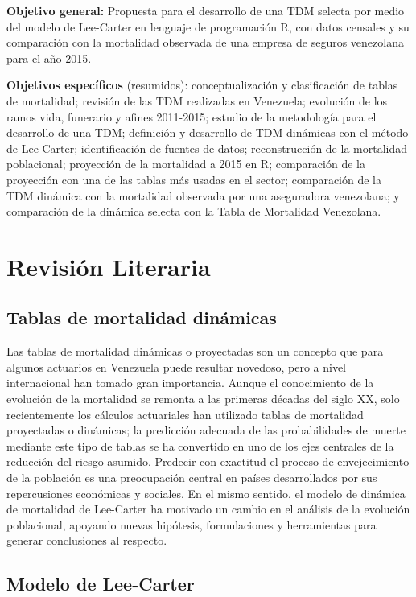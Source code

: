\documentclass[
  11pt,
  a4paper,
]{article}
\begin{document}
\textbf{Objetivo general:} Propuesta para el desarrollo de una TDM
selecta por medio del modelo de Lee-Carter en lenguaje de programación
R, con datos censales y su comparación con la mortalidad observada de
una empresa de seguros venezolana para el año 2015.

\textbf{Objetivos específicos} (resumidos): conceptualización y
clasificación de tablas de mortalidad; revisión de las TDM realizadas en
Venezuela; evolución de los ramos vida, funerario y afines 2011-2015;
estudio de la metodología para el desarrollo de una TDM; definición y
desarrollo de TDM dinámicas con el método de Lee-Carter; identificación
de fuentes de datos; reconstrucción de la mortalidad poblacional;
proyección de la mortalidad a 2015 en R; comparación de la proyección
con una de las tablas más usadas en el sector; comparación de la TDM
dinámica con la mortalidad observada por una aseguradora venezolana; y
comparación de la dinámica selecta con la Tabla de Mortalidad
Venezolana.

\section{Revisión Literaria}\label{revisiuxf3n-literaria}

\subsection{Tablas de mortalidad
dinámicas}\label{tablas-de-mortalidad-dinuxe1micas}

Las tablas de mortalidad dinámicas o proyectadas son un concepto que
para algunos actuarios en Venezuela puede resultar novedoso, pero a
nivel internacional han tomado gran importancia. Aunque el conocimiento
de la evolución de la mortalidad se remonta a las primeras décadas del
siglo XX, solo recientemente los cálculos actuariales han utilizado
tablas de mortalidad proyectadas o dinámicas; la predicción adecuada de
las probabilidades de muerte mediante este tipo de tablas se ha
convertido en uno de los ejes centrales de la reducción del riesgo
asumido. Predecir con exactitud el proceso de envejecimiento de la
población es una preocupación central en países desarrollados por sus
repercusiones económicas y sociales. En el mismo sentido, el modelo de
dinámica de mortalidad de Lee-Carter ha motivado un cambio en el
análisis de la evolución poblacional, apoyando nuevas hipótesis,
formulaciones y herramientas para generar conclusiones al respecto.

\subsection{Modelo de Lee-Carter}\label{modelo-de-lee-carter}
\end{document}
